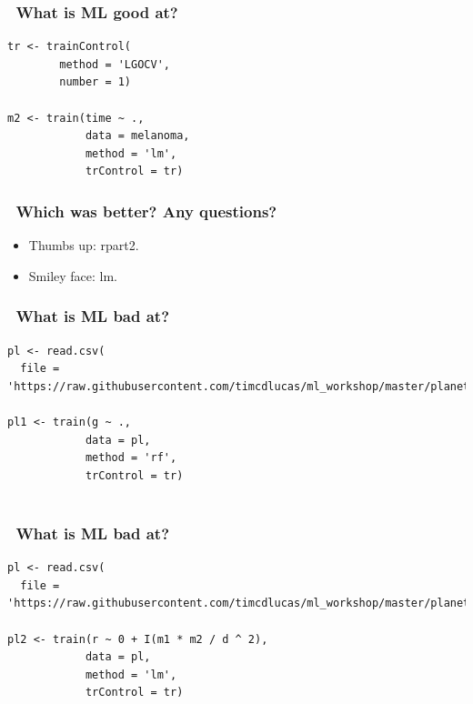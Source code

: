 \documentclass[handout, aspectratio = 169]{beamer}
\begin{document}
\begin{frame}[fragile]
\frametitle{\insertframenumber~What is ML good at?}
\renewcommand{\FancyVerbFormatLine}[1]{%
   \ifnum\value{FancyVerbLine}=7\color{cyan}#1%
   \else #1\fi}
\begin{Verbatim}
tr <- trainControl(
        method = 'LGOCV',
        number = 1)

m2 <- train(time ~ ., 
            data = melanoma,
            method = 'lm',
            trControl = tr)

\end{Verbatim}

\end{frame} 



\begin{frame}
\frametitle{\insertframenumber~Which was better? Any questions?}

\begin{itemize}
\item Thumbs up: rpart2.
\item Smiley face: lm.
\end{itemize}
\end{frame} 




\begin{frame}[fragile]
\frametitle{\insertframenumber~What is ML bad at?}
\renewcommand{\FancyVerbFormatLine}[1]{%
   \ifnum\value{FancyVerbLine}=1\color{cyan}#1%
   \else #1\fi}
\begin{Verbatim}
pl <- read.csv(
  file = 'https://raw.githubusercontent.com/timcdlucas/ml_workshop/master/planets.csv')

pl1 <- train(g ~ ., 
            data = pl,
            method = 'rf',
            trControl = tr)


\end{Verbatim}

\end{frame} 


\begin{frame}[fragile]
\frametitle{\insertframenumber~What is ML bad at?}
\renewcommand{\FancyVerbFormatLine}[1]{%
   \ifnum\value{FancyVerbLine}=1\color{cyan}#1%
   \else #1\fi}
\begin{Verbatim}
pl <- read.csv(
  file = 'https://raw.githubusercontent.com/timcdlucas/ml_workshop/master/planets.csv')

pl2 <- train(r ~ 0 + I(m1 * m2 / d ^ 2), 
            data = pl,
            method = 'lm',
            trControl = tr)

\end{Verbatim}

\end{frame} 
\end{document}
